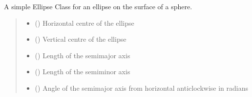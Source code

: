 \documentclass[letterpaper,10pt,english]{sphinxmanual}
\begin{document}
\begin{fulllineitems}
\label{\detokenize{users_guide:GeoSpatialTools.quadtree.Ellipse}}
\pysigstartsignatures
\pysiglinewithargsret
{}
{\sphinxparamcomma {}\sphinxparamcomma {}\sphinxparamcomma {}\sphinxparamcomma {}}
{}
\pysigstopsignatures
\sphinxAtStartPar
A simple Ellipse Class for an ellipse on the surface of a sphere.
\begin{quote}\begin{description}
\begin{itemize}
\item {} 
\sphinxAtStartPar
{} () \textendash{} Horizontal centre of the ellipse

\item {} 
\sphinxAtStartPar
{} () \textendash{} Vertical centre of the ellipse

\item {} 
\sphinxAtStartPar
{} () \textendash{} Length of the semi\sphinxhyphen{}major axis

\item {} 
\sphinxAtStartPar
{} () \textendash{} Length of the semi\sphinxhyphen{}minor axis

\item {} 
\sphinxAtStartPar
{} () \textendash{} Angle of the semi\sphinxhyphen{}major axis from horizontal anti\sphinxhyphen{}clockwise in radians

\end{itemize}

\end{description}\end{quote}


\end{fulllineitems}
\end{document}
